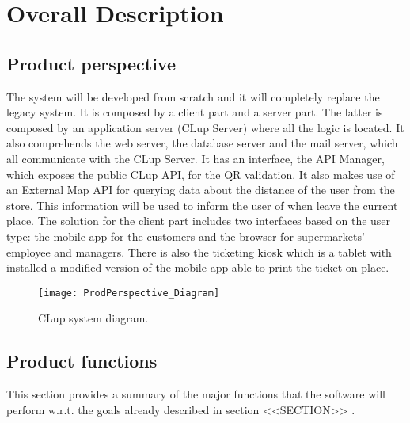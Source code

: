 \chapter{Overall Description}

\section{Product perspective}

The system will be developed from scratch and it will completely replace the legacy system. \newline
It is composed by a client part and a server part.
The latter is composed by an application server (CLup Server) where all the logic is located. It also comprehends the web server, the database server and the mail server,
which all communicate with the CLup Server.
It has an interface, the API Manager, which exposes the public CLup API, for the QR validation. It also makes use of an External Map API for querying data about the
distance of the user from the store. This information will be used to inform the user of when leave the current place.\newline
The solution for the client part includes two interfaces based on the user type: the mobile app for the customers and the browser for supermarkets' employee and managers.
There is also the ticketing kiosk which is a tablet with installed a modified version of the mobile app able to print the ticket on place.
\begin{figure}[H]
	\centering
	\texttt{[image: ProdPerspective\_Diagram]}
	\caption{CLup system diagram.}
\end{figure}

\section{Product functions}
This section provides a summary of the major functions that the software will perform w.r.t. the goals already described in section <<SECTION>> .

